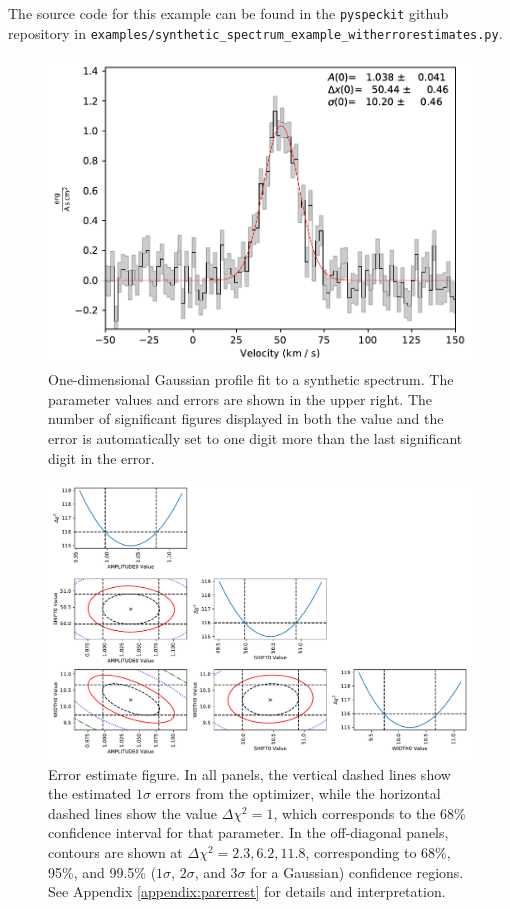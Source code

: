 \documentclass[twocolumn]{aastex62}
\newcommand{\pyspeckit}{\texttt{pyspeckit}\xspace}
\begin{document}
The source code for this example can be found in the \pyspeckit github
repository in \texttt{examples/synthetic\_spectrum\_example\_witherrorestimates.py}.

\begin{figure}[!htp]
\includegraphics[scale=1,width=7in]{oned_gaussfit_example.pdf}
\caption{One-dimensional Gaussian profile fit to a synthetic spectrum.
The parameter values and errors are shown in the upper right.  The number of
significant figures displayed in both the value and the error is automatically
set to one digit more than the last significant digit in the error.}
\label{fig:synthspecdemo}
\end{figure}


\begin{figure}[!htp]
\includegraphics[scale=1,width=7in]{error_estimate_demonstration.pdf}
\caption{Error estimate figure.
In all panels, the vertical
dashed lines show the estimated $1\sigma$ errors from the optimizer, while the
horizontal dashed lines show the value $\Delta\chi^2=1$, which corresponds to
the 68\% confidence interval for that parameter.
In the off-diagonal panels, contours are shown at $\Delta\chi^2=2.3,6.2,11.8$,
corresponding to 68\%, 95\%, and 99.5\% ($1\sigma$, $2\sigma$, and $3\sigma$
for a Gaussian) confidence regions.
See Appendix \ref{appendix:parerrest} for details and interpretation.}
\label{fig:parerrestdemo}
\end{figure}
\end{document}
